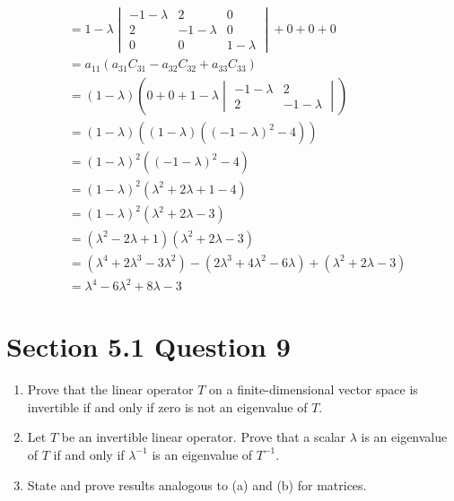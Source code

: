 \documentclass[13pt]{article}
\begin{document}
\begin{enumerate}[label=(\alph*),leftmargin=*]
\begin{align*}
                                &= 1 - \lambda
                                  \begin{vmatrix}
                                    -1 - \lambda & 2 & 0 \\
                                    2 & -1 - \lambda & 0 \\
                                    0 & 0 & 1 - \lambda
                                  \end{vmatrix} + 0 + 0 + 0 \\
                                &= a_{11}(a_{31}C_{31} - a_{32}C_{32} + a_{33}C_{33}) \\
                                &= (1 - \lambda) \left(0 + 0 + 1 - \lambda
                                  \begin{vmatrix}
                                    -1 - \lambda & 2 \\
                                    2 & -1 - \lambda
                                  \end{vmatrix}\right) \\
                                &= (1 - \lambda)((1 - \lambda)((-1 - \lambda)^2 - 4)) \\
                                &= (1 - \lambda)^2((-1 - \lambda)^2 - 4) \\
                                &= (1 - \lambda)^2(\lambda^2 + 2\lambda + 1 - 4) \\
                                &= (1 - \lambda)^2(\lambda^2 + 2\lambda - 3) \\
                                &= (\lambda^2 - 2\lambda + 1)(\lambda^2 + 2\lambda - 3) \\
                                &= (\lambda^4 + 2\lambda^3 - 3\lambda^2) - (2\lambda^3 + 4\lambda^2 - 6\lambda) + (\lambda^2 + 2\lambda - 3) \\
                                &= \lambda^4 - 6\lambda^2 + 8\lambda - 3                                  
  \end{align*}
\end{enumerate}





\newpage
\section*{Section 5.1 Question 9}
\begin{enumerate}[label=(\alph*),leftmargin=*]
\item Prove that the linear operator $T$ on a finite-dimensional vector space is invertible if and only if zero is not an eigenvalue of $T$.
\item Let $T$ be an invertible linear operator. Prove that a scalar $\lambda$ is an eigenvalue of $T$ if and only if $\lambda^{-1}$ is an eigenvalue of $T^{-1}$.
\item State and prove results analogous to (a) and (b) for matrices.
\end{enumerate}
\end{document}
